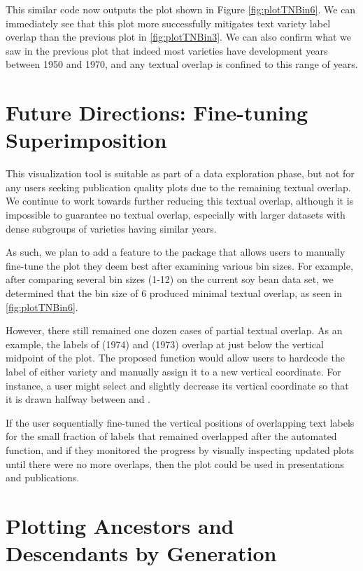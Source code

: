 \documentclass[article,shortnames]{jss}
\begin{document}
This similar code now outputs the plot shown in Figure \ref{fig:plotTNBin6}. We can immediately see that this plot more successfully mitigates text variety label overlap than the previous plot in \ref{fig:plotTNBin3}. We can also confirm what we saw in the previous plot that indeed most varieties have development years between 1950 and 1970, and any textual overlap is confined to this range of years.

\section{Future Directions: Fine-tuning Superimposition}

This visualization tool is suitable as part of a data exploration phase, but not for any users seeking publication quality plots due to the remaining textual overlap. We continue to work towards further reducing this textual overlap, although it is impossible to guarantee no textual overlap, especially with larger datasets with dense subgroups of varieties having similar years.

As such, we plan to add a feature to the  package that allows users to manually fine-tune the plot they deem best after examining various bin sizes. For example, after comparing several bin sizes (1-12) on the current soy bean data set, we determined that the bin size of 6 produced minimal textual overlap, as seen in \ref{fig:plotTNBin6}.

However, there still remained one dozen cases of partial textual overlap. As an example, the labels of  (1974) and  (1973) overlap at just below the vertical midpoint of the plot. The proposed function would allow users to hardcode the label of either variety and manually assign it to a new vertical coordinate. For instance, a user might select  and slightly decrease its vertical coordinate so that it is drawn halfway between  and .

If the user sequentially fine-tuned the vertical positions of overlapping text labels for the small fraction of labels that remained overlapped after the automated function, and if they monitored the progress by visually inspecting updated plots until there were no more overlaps, then the plot could be used in presentations and publications.

\section{Plotting Ancestors and Descendants by Generation}
\end{document}
